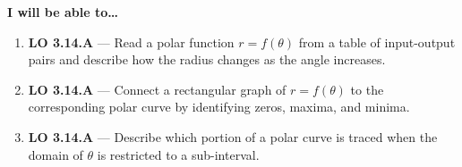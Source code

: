 \documentclass[10pt]{article}
\begin{document}
\namedateperiod

\vspace{0.08in}

\begin{objectivebox}
\textbf{I will be able to\ldots}
\begin{enumerate}[leftmargin=1.5em, itemsep=4pt]
  \item \textbf{LO 3.14.A} --- Read a polar function $r = f(\theta)$ from a table of
    input-output pairs and describe how the radius changes as the angle increases.
  \item \textbf{LO 3.14.A} --- Connect a rectangular graph of $r = f(\theta)$ to the
    corresponding polar curve by identifying zeros, maxima, and minima.
  \item \textbf{LO 3.14.A} --- Describe which portion of a polar curve is traced when
    the domain of $\theta$ is restricted to a sub-interval.
\end{enumerate}
\end{objectivebox}

\vspace{0.08in}
\end{document}
